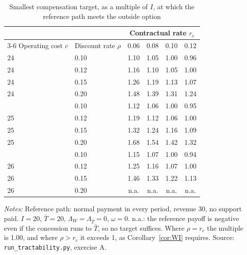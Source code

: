 \begin{table}[htbp]\centering\small
\caption{Smallest compensation target, as a multiple of $I$, at which the reference path meets the outside option}\label{tab:c1A}
\begin{threeparttable}\begin{tabular}{llcccc}\toprule
 & & \multicolumn{4}{c}{Contractual rate $r_c$}\\\cmidrule(l){3-6}
Operating cost $c$ & Discount rate $\rho$ & 0.06 & 0.08 & 0.10 & 0.12\\\midrule
24 & 0.10 & 1.10 & 1.05 & 1.00 & 0.96\\
24 & 0.12 & 1.16 & 1.10 & 1.05 & 1.00\\
24 & 0.15 & 1.26 & 1.19 & 1.13 & 1.07\\
24 & 0.20 & 1.48 & 1.39 & 1.31 & 1.24\\
\addlinespace
25 & 0.10 & 1.12 & 1.06 & 1.00 & 0.95\\
25 & 0.12 & 1.19 & 1.12 & 1.06 & 1.00\\
25 & 0.15 & 1.32 & 1.24 & 1.16 & 1.09\\
25 & 0.20 & 1.68 & 1.54 & 1.42 & 1.32\\
\addlinespace
26 & 0.10 & 1.15 & 1.07 & 1.00 & 0.94\\
26 & 0.12 & 1.25 & 1.16 & 1.07 & 1.00\\
26 & 0.15 & 1.46 & 1.33 & 1.22 & 1.13\\
26 & 0.20 & n.a. & n.a. & n.a. & n.a.\\
\bottomrule\end{tabular}
\begin{tablenotes}\footnotesize\item \textit{Notes:} Reference path: normal payment in every period, revenue 30, no support paid. $I = 20$, $\bar T = 20$, $\Lambda_W = \Lambda_{\bar T} = 0$, $\omega = 0$. n.a.: the reference payoff is negative even if the concession runs to $\bar T$, so no target suffices. Where $\rho = r_c$ the multiple is 1.00, and where $\rho > r_c$ it exceeds 1, as Corollary~\ref{cor:WI} requires. Source: \texttt{run\_tractability.py}, exercise A.\end{tablenotes}
\end{threeparttable}\end{table}

